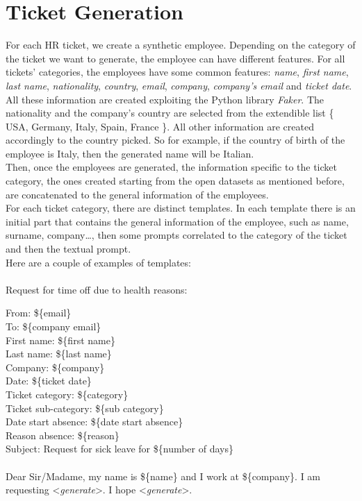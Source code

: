 \section{Ticket Generation}
\label{sec:ticket_generation}
For each HR ticket, we create a synthetic employee. Depending on the category of the ticket we want to generate, the employee can have different features. For all tickets' categories, the employees have some common features: \textit{name}, \textit{first name}, \textit{last name}, \textit{nationality}, \textit{country}, \textit{email}, \textit{company}, \textit{company's email} and \textit{ticket date}.\\
All these information are created exploiting the Python library \textit{Faker}\cite{Faraglia_Faker}. The nationality and the company's country are selected from the extendible list \{ USA, Germany, Italy, Spain, France \}. All other information are created accordingly to the country picked. So for example, if the country of birth of the employee is Italy, then the generated name will be Italian. \\
Then, once the employees are generated, the information specific to the ticket category, the ones created starting from the open datasets as mentioned before, are concatenated to the general information of the employees. \\
For each ticket category, there are distinct templates. In each template there is an initial part that contains the general information of the employee, such as name, surname, company\dots, then some prompts correlated to the category of the ticket and then the textual prompt. \\
Here are a couple of examples of templates:\\ \\
Request for time off due to health reasons:
\begin{adjustwidth}{1cm}{}
From: \$\{email\} \\
To: \$\{company email\} \\
First name: \$\{first name\}\\
Last name: \$\{last name\}\\
Company: \$\{company\}\\
Date: \$\{ticket date\}\\
Ticket category: \$\{category\}\\
Ticket sub-category: \$\{sub category\} \\
Date start absence: \$\{date start absence\} \\
Reason absence: \$\{reason\} \\ 
Subject: Request for sick leave for \$\{number of days\} \\ 
\\
Dear Sir/Madame, my name is \$\{name\} and I work at \$\{company\}. I am requesting \textless \textit{generate}\textgreater. I hope \textless \textit{generate}\textgreater. \\ \\

\end{adjustwidth}
